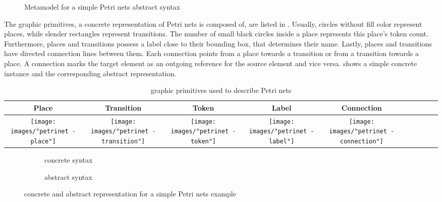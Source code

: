 \begin{figure}[H]
  \centering
  
  \caption{Metamodel for a simple Petri nets abstract syntax}
  \label{fig:petrinets_metamodel}
\end{figure}

The graphic primitives, a concrete representation of Petri nets is composed of, are listed in . Usually, circles without fill color represent places, while slender rectangles represent transitions. The number of small black circles inside a place represents this place's token count. Furthermore, places and transitions possess a label close to their bounding box, that determines their name. Lastly, places and transitions have directed connection lines between them. Each connection points from a place towards a transition or from a transition towards a place. A connection marks the target element as an outgoing reference for the source element and vice versa.  shows a simple concrete instance and the corresponding abstract representation.



\begin{table}[ht]
  \centering
\begin{tabular}[width=.1\linewidth]{| Sc | Sc | Sc | Sc | Sc |}
  \hline
  Place & Transition & Token & Label & Connection 
  \\
  \hline
  \texttt{[image: images/"petrinet - place"]} 
  & 
  \texttt{[image: images/"petrinet - transition"]} 
  & 
  \texttt{[image: images/"petrinet - token"]}
  & 
  \texttt{[image: images/"petrinet - label"]}
  & 
  \texttt{[image: images/"petrinet - connection"]} 
  \\
  \hline
\end{tabular}
\caption{graphic primitives used to describe Petri nets}
\label{tab:petri-primitives}
\end{table}

\begin{figure}[ht!]
  \centering
  \begin{subfigure}[t]{.35\textwidth}
    \centering
    
    \caption{concrete syntax}
    \label{subfig:petriconcrete}    
  \end{subfigure}
  \begin{subfigure}[t]{.4\textwidth}
    \centering
    
    \caption{abstract syntax}
    \label{subfig:petriabstract}    
  \end{subfigure}
  \caption{concrete and abstract representation for a simple Petri nets example}
  \label{fig:petrinets_example}
\end{figure} 

